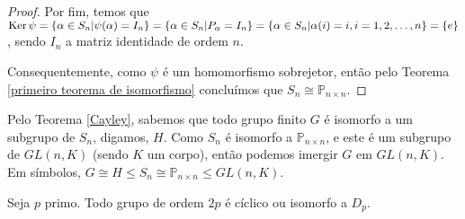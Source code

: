 \begin{proof}
		\par\vspace{0.3cm} Por fim, temos que $\operatorname{Ker}\psi = \{ \alpha\in S_n | \psi(\alpha) = I_n \} 
		= \{ \alpha\in S_n | P_{\alpha} = I_n \} = \{ \alpha\in S_n | \alpha(i) = i, i=1,2,\dots,n \} = \{e\}$,
		sendo $I_n$ a matriz identidade de ordem $n$.
		
		\par\vspace{0.3cm} Consequentemente, como $\psi$ é um homomorfismo sobrejetor, então pelo 
		Teorema \eqref{primeiro teorema de isomorfismo} concluímos que $S_n\cong\mathbb{P}_{n\times n}$.
	\end{proof}
	\begin{remark}
		Pelo Teorema \eqref{Cayley}, sabemos que todo grupo finito $G$ é isomorfo a um subgrupo de $S_n$, 
		digamos, $H$. Como $S_n$ é isomorfo a $\mathbb{P}_{n\times n}$, e este é um subgrupo de $GL(n,K)$ 
		(sendo $K$ um corpo), então podemos imergir $G$ em $GL(n,K)$. Em símbolos, 
		$G\cong H\leq S_n\cong\mathbb{P}_{n\times n}\leq GL(n,K)$.
	\end{remark}
	\begin{lemma}
	\label{grupos de ordem 2p}
		Seja $p$ primo. Todo grupo de ordem $2p$ é cíclico ou isomorfo a $D_p$.
	\end{lemma}
